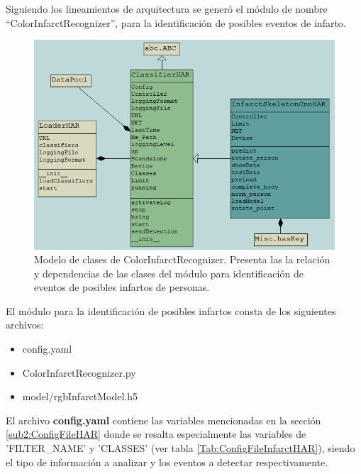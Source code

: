         Siguiendo los lineamientos de arquitectura se generó el módulo de nombre ``ColorInfarctRecognizer'', para la identificación de posibles eventos de infarto.
        
        \begin{figure}[ht!]
        	\centering
        	\includegraphics[width=0.9\linewidth]{imgs/04-Construction/04-HarClassModel.PNG}
        	\caption[Modelo de clases de ColorInfarctRecognizer]{Modelo de clases de ColorInfarctRecognizer. Presenta las la relación y dependencias de las clases del módulo para identificación de eventos de posibles infartos de personas.}
    	    \label{fig:InfarctHARClassModel}
        \end{figure}%
        
        El módulo para la identificación de posibles infartos consta de los siguientes archivos:
        
        \begin{itemize}
            \item config.yaml
            \item ColorInfarctRecognizer.py
            \item model/rgbInfarctModel.h5
        \end{itemize}
        
        El archivo \textbf{config.yaml} contiene las variables mencionadas en la sección \ref{sub2:ConfigFileHAR} donde se resalta especialmente las variables de 'FILTER\_NAME' y 'CLASSES' (ver tabla \ref{Tab:ConfigFileInfarctHAR}), siendo el tipo de información a analizar y los eventos a detectar respectivamente.
        
